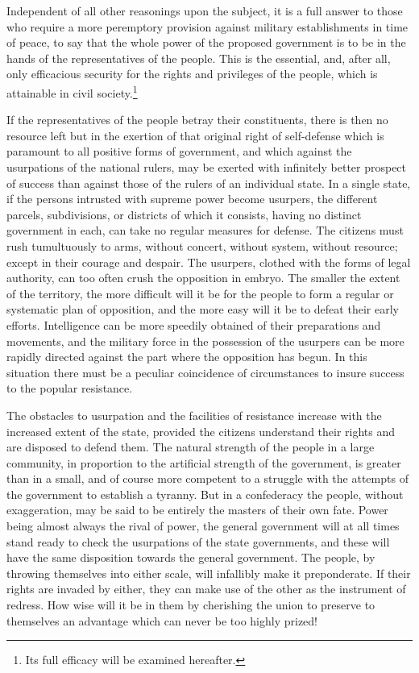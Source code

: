 Independent of all other reasonings upon the subject, it is a full answer to those who require a more peremptory provision against military establishments in time of peace, to say that the whole power of the proposed government is to be in the hands of the representatives of the people. 
This is the essential, and, after all, only efficacious security for the rights and privileges of the people, which is attainable in civil society.\footnote{Its full efficacy will be examined hereafter.}

If the representatives of the people betray their constituents, there is then no resource left but in the exertion of that original right of self-defense which is paramount to all positive forms of government, and which against the usurpations of the national rulers, may be exerted with infinitely better prospect of success than against those of the rulers of an individual state. 
In a single state, if the persons intrusted with supreme power become usurpers, the different parcels, subdivisions, or districts of which it consists, having no distinct government in each, can take no regular measures for defense. 
The citizens must rush tumultuously to arms, without concert, without system, without resource; except in their courage and despair. 
The usurpers, clothed with the forms of legal authority, can too often crush the opposition in embryo. 
The smaller the extent of the territory, the more difficult will it be for the people to form a regular or systematic plan of opposition, and the more easy will it be to defeat their early efforts. 
Intelligence can be more speedily obtained of their preparations and movements, and the military force in the possession of the usurpers can be more rapidly directed against the part where the opposition has begun. 
In this situation there must be a peculiar coincidence of circumstances to insure success to the popular resistance.

The obstacles to usurpation and the facilities of resistance increase with the increased extent of the state, provided the citizens understand their rights and are disposed to defend them. 
The natural strength of the people in a large community, in proportion to the artificial strength of the government, is greater than in a small, and of course more competent to a struggle with the attempts of the government to establish a tyranny. 
But in a confederacy the people, without exaggeration, may be said to be entirely the masters of their own fate. 
Power being almost always the rival of power, the general government will at all times stand ready to check the usurpations of the state governments, and these will have the same disposition towards the general government. 
The people, by throwing themselves into either scale, will infallibly make it preponderate. 
If their rights are invaded by either, they can make use of the other as the instrument of redress. 
How wise will it be in them by cherishing the union to preserve to themselves an advantage which can never be too highly prized!

